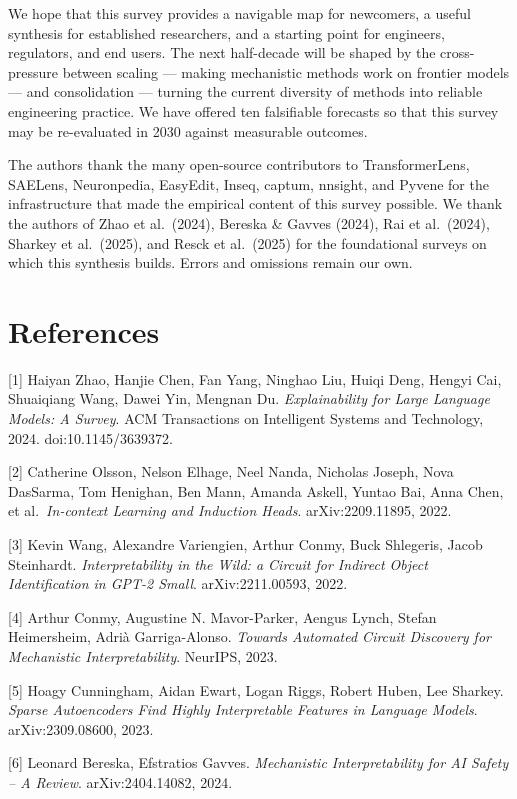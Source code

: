 We hope that this survey provides a navigable map for newcomers, a useful synthesis for established researchers, and a starting point for engineers, regulators, and end users. The next half-decade will be shaped by the cross-pressure between scaling --- making mechanistic methods work on frontier models --- and consolidation --- turning the current diversity of methods into reliable engineering practice. We have offered ten falsifiable forecasts so that this survey may be re-evaluated in 2030 against measurable outcomes.

The authors thank the many open-source contributors to TransformerLens, SAELens, Neuronpedia, EasyEdit, Inseq, captum, nnsight, and Pyvene for the infrastructure that made the empirical content of this survey possible. We thank the authors of Zhao et al.~(2024), Bereska \& Gavves (2024), Rai et al.~(2024), Sharkey et al.~(2025), and Resck et al.~(2025) for the foundational surveys on which this synthesis builds. Errors and omissions remain our own.

\section{References}\label{references}

{[}1{]} Haiyan Zhao, Hanjie Chen, Fan Yang, Ninghao Liu, Huiqi Deng, Hengyi Cai, Shuaiqiang Wang, Dawei Yin, Mengnan Du. \emph{Explainability for Large Language Models: A Survey}. ACM Transactions on Intelligent Systems and Technology, 2024. doi:10.1145/3639372.

{[}2{]} Catherine Olsson, Nelson Elhage, Neel Nanda, Nicholas Joseph, Nova DasSarma, Tom Henighan, Ben Mann, Amanda Askell, Yuntao Bai, Anna Chen, et al.~\emph{In-context Learning and Induction Heads}. arXiv:2209.11895, 2022.

{[}3{]} Kevin Wang, Alexandre Variengien, Arthur Conmy, Buck Shlegeris, Jacob Steinhardt. \emph{Interpretability in the Wild: a Circuit for Indirect Object Identification in GPT-2 Small}. arXiv:2211.00593, 2022.

{[}4{]} Arthur Conmy, Augustine N. Mavor-Parker, Aengus Lynch, Stefan Heimersheim, Adrià Garriga-Alonso. \emph{Towards Automated Circuit Discovery for Mechanistic Interpretability}. NeurIPS, 2023.

{[}5{]} Hoagy Cunningham, Aidan Ewart, Logan Riggs, Robert Huben, Lee Sharkey. \emph{Sparse Autoencoders Find Highly Interpretable Features in Language Models}. arXiv:2309.08600, 2023.

{[}6{]} Leonard Bereska, Efstratios Gavves. \emph{Mechanistic Interpretability for AI Safety -- A Review}. arXiv:2404.14082, 2024.

